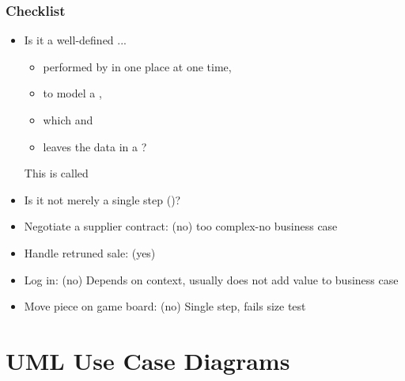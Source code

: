 \subsubsection*{Checklist}
\begin{itemize}
    \item Is it a well-defined  ...
    \begin{itemize}
        \item performed by  in one place at one time,
        \item to model a , 
        \item which  and
        \item leaves the data in a ?
    \end{itemize}
    This is called 
    \item Is it not merely a single step ()?
\end{itemize}

\begin{defBox}[title=Which of these phrases is a valid use case?]
    \begin{itemize}
        \item Negotiate a supplier contract: (no) too complex-no  business case
        \item Handle retruned sale: (yes)
        \item Log in: (no) Depends on context, usually does not add value to business case
        \item Move piece on game board: (no) Single step, fails size test
    \end{itemize}
\end{defBox}

\section{UML Use Case Diagrams}
